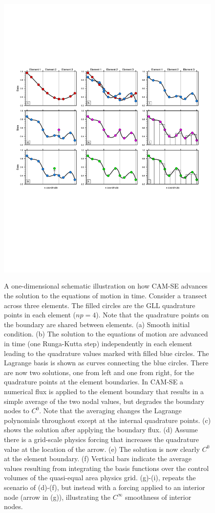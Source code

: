 \documentclass[twocol]{ametsoc}
\begin{document}
\begin{figure}[t]
\noindent\includegraphics[width=38pc,angle=0]{figs/se-schematic-arh-CROP.pdf}\\
\caption{A one-dimensional schematic illustration on how CAM-SE advances the solution to the equations of motion in time. Consider a transect across three elements. The filled circles are the GLL quadrature points in each element ($np=4$). Note that the quadrature points on the boundary are shared between elements. (a) Smooth initial condition. (b) The solution to the equations of motion are advanced in time (one Runga-Kutta step) independently in each element leading to the quadrature values marked with filled blue circles. The Lagrange basis is shown as curves connecting the blue circles. There are now two solutions, one from left and one from right, for the quadrature points at the element boundaries. In CAM-SE a numerical flux is applied to the element boundary that results in a simple average of the two nodal values, but degrades the boundary nodes to $C^0$. Note that the averaging changes the Lagrange polynomials throughout except at the internal quadrature points. (c) shows the solution after applying the boundary flux. (d) Assume there is a grid-scale physics forcing that increases the quadrature value at the location of the arrow. (e) The solution is now clearly $C^0$ at the element boundary. (f) Vertical bars indicate the average values resulting from integrating the basis functions over the control volumes of the quasi-equal area physics grid. (g)-(i), repeats the scenario of (d)-(f), but instead with a forcing applied to an interior node (arrow in (g)), illustrating the $C^{\infty}$ smoothness of interior nodes.}
\label{fig:se-schematic}
\end{figure}
\end{document}
